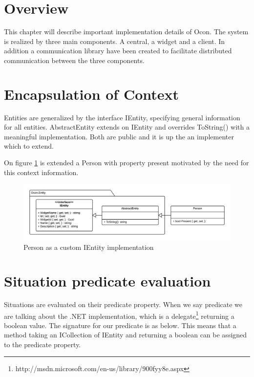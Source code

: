 \documentclass[../report.tex]{subfiles}
\begin{document}
\graphicspath{{img/}{../img/}}

\section{Overview}
This chapter will describe important implementation details of Ocon. The system is realized by three main components. A central, a widget and a client. In addition a communication library have been created to facilitate distributed communication between the three components.


\section{Encapsulation of Context}

Entities are generalized by the interface IEntity, specifying general information for all entities. AbstractEntity extends on IEntity and overrides ToString() with a meaningful implementation. Both are public and it is up the an implementer which to extend.

On figure \ref{fig:PersonImplementation} is extended a Person with property present motivated by the need for this context information.


\begin{figure}[H]
\includegraphics[width=\linewidth]{customEntityClass.png}
\caption{Person as a custom IEntity implementation}
\label{fig:PersonImplementation}
\end{figure}



\section{Situation predicate evaluation}

Situations are evaluated on their predicate property. When we say predicate we are talking about the .NET implementation, which is a delegate\footnote{http://msdn.microsoft.com/en-us/library/900fyy8e.aspx} returning a boolean value. The signature for our predicate is as below. This means that a method taking an ICollection of IEntity and returning a boolean can be assigned to the predicate property.
\end{document}
